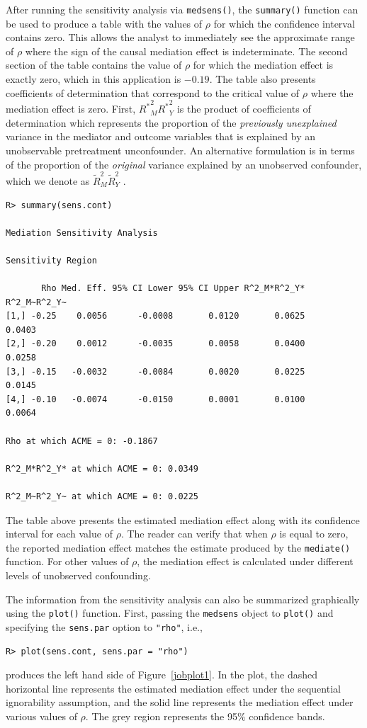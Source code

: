 \documentclass[11pt,letterpaper]{article}
\theoremstyle{plain}
\begin{document}
After running the sensitivity analysis via \texttt{medsens()}, the
\texttt{summary()} function can be used to produce a table with the
values of $\rho$ for which the confidence interval contains zero.
This allows the analyst to immediately see the approximate range of
$\rho$ where the sign of the causal mediation effect is indeterminate.
The second section of the table contains the value of $\rho$ for which
the mediation effect is exactly zero, which in this application is
$-0.19$. The table also presents coefficients of determination that
correspond to the critical value of $\rho$ where the mediation effect
is zero. First, ${R^\ast}^2_M{R^\ast}^2_Y$ is the product of
coefficients of determination which represents the proportion of the
\emph{previously unexplained} variance in the mediator and outcome
variables that is explained by an unobservable pretreatment
unconfounder.  An alternative formulation is in terms of the
proportion of the \emph{original} variance explained by an unobserved
confounder, which we denote as $\widetilde{R}^2_M\widetilde{R}^2_Y$ .
\begin{verbatim}
R> summary(sens.cont)

Mediation Sensitivity Analysis

Sensitivity Region

       Rho Med. Eff. 95% CI Lower 95% CI Upper R^2_M*R^2_Y* R^2_M~R^2_Y~
[1,] -0.25    0.0056      -0.0008       0.0120       0.0625       0.0403
[2,] -0.20    0.0012      -0.0035       0.0058       0.0400       0.0258
[3,] -0.15   -0.0032      -0.0084       0.0020       0.0225       0.0145
[4,] -0.10   -0.0074      -0.0150       0.0001       0.0100       0.0064

Rho at which ACME = 0: -0.1867

R^2_M*R^2_Y* at which ACME = 0: 0.0349

R^2_M~R^2_Y~ at which ACME = 0: 0.0225

\end{verbatim}
The table above presents the estimated mediation effect along with its
confidence interval for each value of $\rho$.  The reader can verify
that when $\rho$ is equal to zero, the reported mediation effect
matches the estimate produced by the \texttt{mediate()} function.  For
other values of $\rho$, the mediation effect is calculated under
different levels of unobserved confounding.  

The information from the sensitivity analysis can also be summarized
graphically using the \texttt{plot()} function.  First, passing the
\texttt{medsens} object to \texttt{plot()} and specifying the
\texttt{sens.par} option to \texttt{"rho"}, i.e.,
\begin{verbatim}
R> plot(sens.cont, sens.par = "rho")
\end{verbatim}
produces the left hand side of Figure~\ref{jobplot1}.  In the plot, the dashed 
horizontal line represents the estimated mediation effect under the sequential
ignorability assumption, and the solid line represents the mediation
effect under various values of $\rho$.  The grey region represents the
95\% confidence bands.
\end{document}
